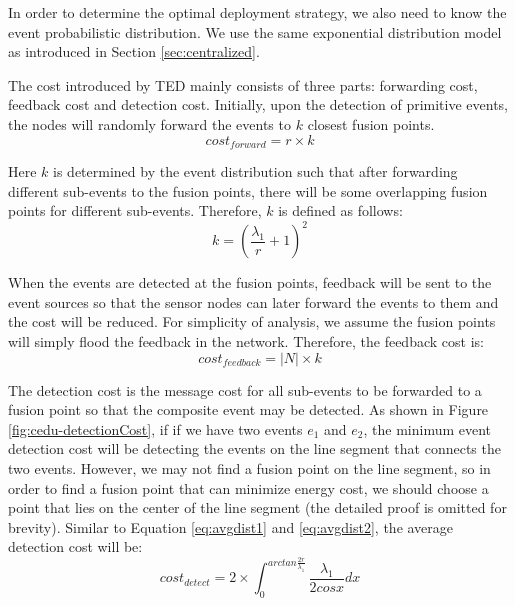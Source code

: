 In order to determine the optimal deployment strategy, we also need to know the event probabilistic distribution. We use the same exponential distribution model as introduced in Section \ref{sec:centralized}. %

The cost introduced by TED mainly consists of three parts: forwarding cost, feedback cost and detection cost. Initially, upon the detection of primitive events, the nodes will randomly forward the events to \(k\) closest fusion points. 
\begin{displaymath}
cost_{forward}=r\times k
\end{displaymath}

Here \(k\) is determined by the event distribution such that after forwarding different sub-events to the fusion points, there will be some overlapping fusion points for different sub-events. Therefore, \(k\) is defined as follows:
\begin{equation}
k=(\frac{{\lambda}_1}{r}+1)^2\label{eq:forwardNum}
\end{equation}

When the events are detected at the fusion points, feedback will be sent to the event sources so that the sensor nodes can later forward the events to them and the cost will be reduced. For simplicity of analysis, we assume the fusion points will simply flood the feedback in the network. Therefore, the feedback cost is:
\begin{displaymath}
cost_{feedback}=|N|\times k
\end{displaymath}

The detection cost is the message cost for all sub-events to be forwarded to a fusion point so that the composite event may be detected. As shown in Figure \ref{fig:cedu-detectionCost}, if if we have two events \(e_1\) and \(e_2\), the minimum event detection cost will be detecting the events on the line segment that connects the two events. However, we may not find a fusion point on the line segment, so in order to find a fusion point that can minimize energy cost, we should choose a point that lies on the center of the line segment (the detailed proof is omitted for brevity). Similar to Equation \ref{eq:avgdist1} and \ref{eq:avgdist2}, the average detection cost will be:
\begin{displaymath}
cost_{detect}=2\times \int_0^{arctan\frac{2r}{{\lambda}_1}}\frac{{\lambda}_1}{2cosx}dx
\end{displaymath}

